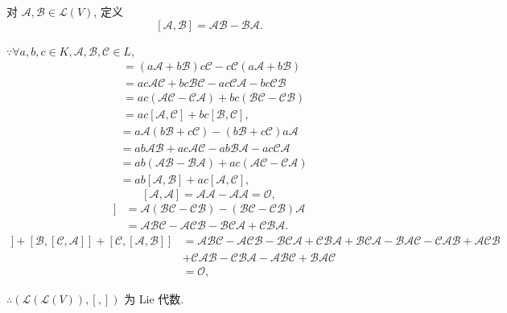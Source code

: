 \documentclass{ctexart}
\begin{document}
\begin{example}
    对 $\mathcal{A},\mathcal{B}\in\mathcal{L}(V)$, 定义
    \[[\mathcal{A},\mathcal{B}]=\mathcal{A}\mathcal{B}-\mathcal{B}\mathcal{A}.\]

    $\because\forall a,b,c\in K,\mathcal{A},\mathcal{B},\mathcal{C}\in L$,
    \begin{align*}
        [a\mathcal{A}+b\mathcal{B},c\mathcal{C}] & =(a\mathcal{A}+b\mathcal{B})c\mathcal{C}-c\mathcal{C}(a\mathcal{A}+b\mathcal{B}) \\
        & =ac\mathcal{A}\mathcal{C}+bc\mathcal{B}\mathcal{C}-ac\mathcal{C}\mathcal{A}-bc\mathcal{C}\mathcal{B} \\
        & =ac(\mathcal{A}\mathcal{C}-\mathcal{C}\mathcal{A})+bc(\mathcal{B}\mathcal{C}-\mathcal{C}\mathcal{B}) \\
        & =ac[\mathcal{A},\mathcal{C}]+bc[\mathcal{B},\mathcal{C}],
    \end{align*}
    \begin{align*}
        [a\mathcal{A},b\mathcal{B}+c\mathcal{C}] & =a\mathcal{A}(b\mathcal{B}+c\mathcal{C})-(b\mathcal{B}+c\mathcal{C})a\mathcal{A} \\
        & =ab\mathcal{A}\mathcal{B}+ac\mathcal{A}\mathcal{C}-ab\mathcal{B}\mathcal{A}-ac\mathcal{C}\mathcal{A} \\
        & =ab(\mathcal{A}\mathcal{B}-\mathcal{B}\mathcal{A})+ac(\mathcal{A}\mathcal{C}-\mathcal{C}\mathcal{A}) \\
        & =ab[\mathcal{A},\mathcal{B}]+ac[\mathcal{A},\mathcal{C}],
    \end{align*}
    \[[\mathcal{A},\mathcal{A}]=\mathcal{A}\mathcal{A}-\mathcal{A}\mathcal{A}=\mathcal{O},\]
    \begin{align*}
        [\mathcal{A},[\mathcal{B},\mathcal{C}]] & =\mathcal{A}(\mathcal{B}\mathcal{C}-\mathcal{C}\mathcal{B})-(\mathcal{B}\mathcal{C}-\mathcal{C}\mathcal{B})\mathcal{A} \\
        & =\mathcal{A}\mathcal{B}\mathcal{C}-\mathcal{A}\mathcal{C}\mathcal{B}-\mathcal{B}\mathcal{C}\mathcal{A}+\mathcal{C}\mathcal{B}\mathcal{A}.
    \end{align*}
    \begin{align*}
        [\mathcal{A},[\mathcal{B},\mathcal{C}]]+[\mathcal{B},[\mathcal{C},\mathcal{A}]]+[\mathcal{C},[\mathcal{A},\mathcal{B}]] & =\mathcal{A}\mathcal{B}\mathcal{C}-\mathcal{A}\mathcal{C}\mathcal{B}-\mathcal{B}\mathcal{C}\mathcal{A}+\mathcal{C}\mathcal{B}\mathcal{A}+\mathcal{B}\mathcal{C}\mathcal{A}-\mathcal{B}\mathcal{A}\mathcal{C}-\mathcal{C}\mathcal{A}\mathcal{B}+\mathcal{A}\mathcal{C}\mathcal{B} \\
        & +\mathcal{C}\mathcal{A}\mathcal{B}-\mathcal{C}\mathcal{B}\mathcal{A}-\mathcal{A}\mathcal{B}\mathcal{C}+\mathcal{B}\mathcal{A}\mathcal{C} \\
        & =\mathcal{O},
    \end{align*}

    $\therefore(\mathcal{L}(\mathcal{L}(V)),[,])$ 为 Lie 代数.
\end{example}
\end{document}
